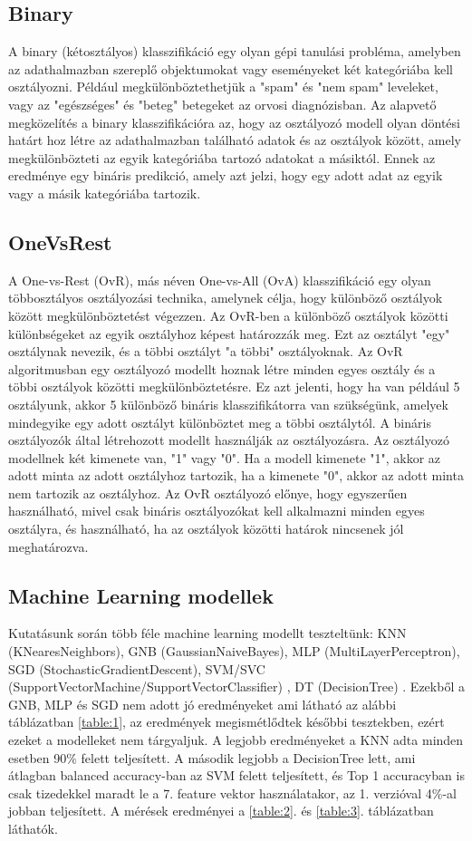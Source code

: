 \documentclass[acmtog, authorversion]{acmart}
\begin{document}
\subsection{Binary}
A binary (kétosztályos) klasszifikáció egy olyan gépi tanulási probléma, amelyben az adathalmazban szereplő objektumokat vagy eseményeket két kategóriába kell osztályozni. Például megkülönböztethetjük a "spam" és "nem spam" leveleket, vagy az "egészséges" és "beteg" betegeket az orvosi diagnózisban.
Az alapvető megközelítés a binary klasszifikációra az, hogy az osztályozó modell olyan döntési határt hoz létre az adathalmazban található adatok és az osztályok között, amely megkülönbözteti az egyik kategóriába tartozó adatokat a másiktól. Ennek az eredménye egy bináris predikció, amely azt jelzi, hogy egy adott adat az egyik vagy a másik kategóriába tartozik.
\subsection{OneVsRest}
A One-vs-Rest (OvR), más néven One-vs-All (OvA) klasszifikáció egy olyan többosztályos osztályozási technika, amelynek célja, hogy különböző osztályok között megkülönböztetést végezzen. Az OvR-ben a különböző osztályok közötti különbségeket az egyik osztályhoz képest határozzák meg. Ezt az osztályt "egy" osztálynak nevezik, és a többi osztályt "a többi" osztályoknak.
Az OvR algoritmusban egy osztályozó modellt hoznak létre minden egyes osztály és a többi osztályok közötti megkülönböztetésre. Ez azt jelenti, hogy ha van például 5 osztályunk, akkor 5 különböző bináris klasszifikátorra van szükségünk, amelyek mindegyike egy adott osztályt különböztet meg a többi osztálytól.
A bináris osztályozók által létrehozott modellt használják az osztályozásra. Az osztályozó modellnek két kimenete van, "1" vagy "0". Ha a modell kimenete "1", akkor az adott minta az adott osztályhoz tartozik, ha a kimenete "0", akkor az adott minta nem tartozik az osztályhoz.
Az OvR osztályozó előnye, hogy egyszerűen használható, mivel csak bináris osztályozókat kell alkalmazni minden egyes osztályra, és használható, ha az osztályok közötti határok nincsenek jól meghatározva.
\subsection{Machine Learning modellek}
Kutatásunk során több féle machine learning modellt teszteltünk: KNN (KNearesNeighbors), GNB (GaussianNaiveBayes), MLP (MultiLayerPerceptron), 
SGD (StochasticGradientDescent), SVM/SVC (SupportVectorMachine/SupportVectorClassifier) \cite{CC01a}, DT (DecisionTree) \cite{Breiman1984ClassificationAR}.
Ezekből a GNB, MLP és SGD nem adott jó eredményeket ami látható az alábbi táblázatban \ref{table:1}, az eredmények megismétlődtek későbbi tesztekben, ezért
ezeket a modelleket nem tárgyaljuk. A legjobb eredményeket a KNN adta minden esetben 90\% felett teljesített. A második legjobb a DecisionTree lett, ami átlagban
balanced accuracy-ban az SVM felett teljesített, és Top 1 accuracyban is csak tizedekkel maradt le a 7. feature vektor használatakor, az 1. verzióval 4\%-al
jobban teljesített. A mérések eredményei a \ref{table:2}. és \ref{table:3}. táblázatban láthatók.
\end{document}
